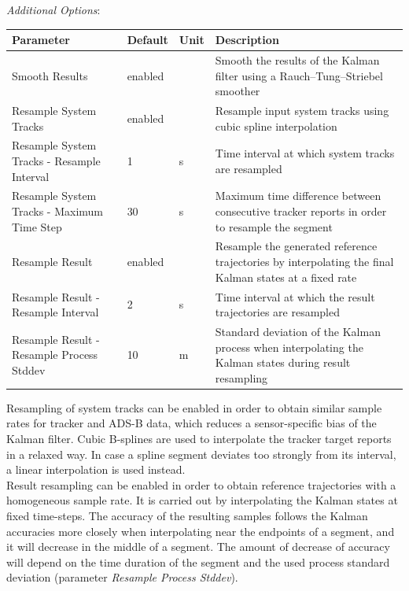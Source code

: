\textit{Additional Options}:
\begin{table}[H]
    \center
    \begin{tabularx}{\textwidth}{ | X | l | l | X |}
        \hline
        \textbf{Parameter} & \textbf{Default} & \textbf{Unit} & \textbf{Description} \\ \hline
        Smooth Results & enabled & & Smooth the results of the Kalman filter using a Rauch–Tung–Striebel smoother \\ \hline
        Resample System Tracks & enabled & & Resample input system tracks using cubic spline interpolation \\ \hline
        Resample System Tracks - Resample Interval & 1 & s & Time interval at which system tracks are resampled \\ \hline
        Resample System Tracks - Maximum Time Step & 30 & s & Maximum time difference between consecutive tracker 
            reports in order to resample the segment \\ \hline
        Resample Result & enabled & & Resample the generated reference trajectories by interpolating the final Kalman states
            at a fixed rate \\ \hline
        Resample Result - Resample Interval & 2 & s & Time interval at which the result trajectories are resampled \\ \hline
        Resample Result - Resample Process Stddev & 10 & m & Standard deviation of the Kalman process when interpolating the 
            Kalman states during result resampling \\ \hline
    \end{tabularx}
\end{table}

Resampling of system tracks can be enabled in order to obtain similar sample rates for tracker and ADS-B
data, which reduces a sensor-specific bias of the Kalman filter. Cubic B-splines are used to interpolate the tracker target
reports in a relaxed way. In case a spline segment deviates too strongly from its interval, a linear interpolation is 
used instead. \\

Result resampling can be enabled in order to obtain reference trajectories with a homogeneous sample rate. 
It is carried out by interpolating the Kalman states at fixed time-steps. The accuracy of the resulting samples
follows the Kalman accuracies more closely when interpolating near the endpoints of a segment, and it will decrease
in the middle of a segment. The amount of decrease of accuracy will depend on the time duration of the segment and the used 
process standard deviation (parameter \textit{Resample Process Stddev}).

